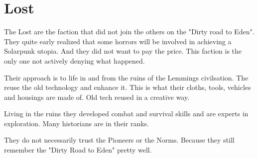 \section{Lost}

The Lost are the faction that did not join the others on the "Dirty road to Eden". They quite early realized that some horrors will be involved in achieving a Solarpunk utopia. And they did not want to pay the price. This faction is the only one not actively denying what happened.

Their approach is to life in and from the ruins of the Lemmings civilsation. The reuse the old technology and enhance it. This is what their cloths, tools, vehicles and housings are made of. Old tech reused in a creative way.

Living in the ruins they developed combat and survival skills and are experts in exploration.
Many historians are in their ranks.

They do not necessarily trust the Pioneers or the Norms. Because they still remember the "Dirty Road to Eden" pretty well.

